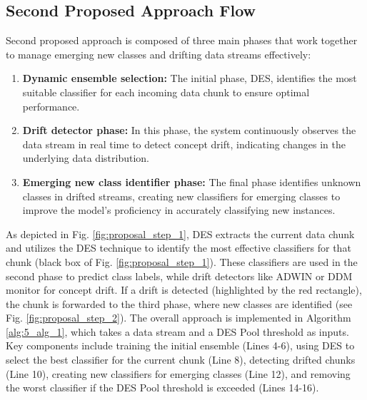 \subsection{Second Proposed Approach Flow}
\label{proposed_overview}
Second proposed approach is composed of three main phases that work together to manage emerging new classes and drifting data streams effectively:
\begin{enumerate}
	\item \textbf{Dynamic ensemble selection:} The initial phase, DES, identifies the most suitable classifier for each incoming data chunk to ensure optimal performance.
	\item \textbf{Drift detector phase:} In this phase, the system continuously observes the data stream in real time to detect concept drift, indicating changes in the underlying data distribution.
	\item \textbf{Emerging new class identifier phase:} The final phase identifies unknown classes in drifted streams, creating new classifiers for emerging classes to improve the model's proficiency in accurately classifying new instances.
\end{enumerate}
As depicted in Fig. \ref{fig:proposal_step_1}, DES extracts the current data chunk and utilizes the DES technique to identify the most effective classifiers for that chunk (black box of Fig. \ref{fig:proposal_step_1}). These classifiers are used in the second phase to predict class labels, while drift detectors like ADWIN or DDM monitor for concept drift. If a drift is detected (highlighted by the red rectangle), the chunk is forwarded to the third phase, where new classes are identified (see Fig. \ref{fig:proposal_step_2}). The overall approach is implemented in Algorithm \ref{alg:5_alg_1}, which takes a data stream and a DES Pool threshold as inputs. Key components include training the initial ensemble (Lines 4-6), using DES to select the best classifier for the current chunk (Line 8), detecting drifted chunks (Line 10), creating new classifiers for emerging classes (Line 12), and removing the worst classifier if the DES Pool threshold is exceeded (Lines 14-16).


